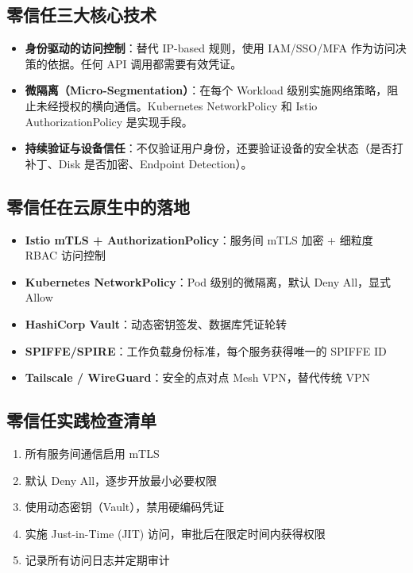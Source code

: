 \documentclass[12pt,UTF8]{ctexbook}
\begin{document}
\subsection{零信任三大核心技术}

\begin{itemize}
    \item \textbf{身份驱动的访问控制}：替代 IP-based 规则，使用 IAM/SSO/MFA 作为访问决策的依据。任何 API 调用都需要有效凭证。
    \item \textbf{微隔离（Micro-Segmentation）}：在每个 Workload 级别实施网络策略，阻止未经授权的横向通信。Kubernetes NetworkPolicy 和 Istio AuthorizationPolicy 是实现手段。
    \item \textbf{持续验证与设备信任}：不仅验证用户身份，还要验证设备的安全状态（是否打补丁、Disk 是否加密、Endpoint Detection）。
\end{itemize}

\subsection{零信任在云原生中的落地}

\begin{itemize}
    \item \textbf{Istio mTLS + AuthorizationPolicy}：服务间 mTLS 加密 + 细粒度 RBAC 访问控制
    \item \textbf{Kubernetes NetworkPolicy}：Pod 级别的微隔离，默认 Deny All，显式 Allow
    \item \textbf{HashiCorp Vault}：动态密钥签发、数据库凭证轮转
    \item \textbf{SPIFFE/SPIRE}：工作负载身份标准，每个服务获得唯一的 SPIFFE ID
    \item \textbf{Tailscale / WireGuard}：安全的点对点 Mesh VPN，替代传统 VPN
\end{itemize}

\subsection{零信任实践检查清单}

\begin{enumerate}
    \item 所有服务间通信启用 mTLS
    \item 默认 Deny All，逐步开放最小必要权限
    \item 使用动态密钥（Vault），禁用硬编码凭证
    \item 实施 Just-in-Time (JIT) 访问，审批后在限定时间内获得权限
    \item 记录所有访问日志并定期审计
\end{enumerate}
\end{document}
